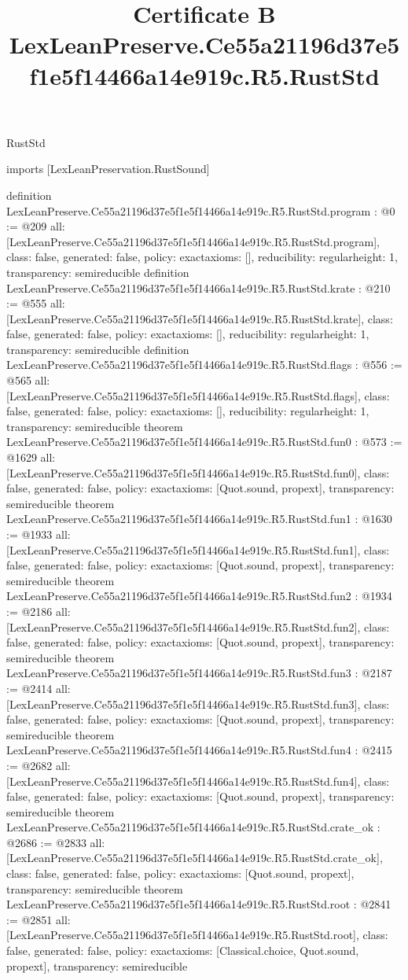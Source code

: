 \begin{lexlean}{RustStd}
\title{Certificate B LexLeanPreserve.Ce55a21196d37e5f1e5f14466a14e919c.R5.RustStd}
\begin{coremodule}
imports [LexLeanPreservation.RustSound]

definition LexLeanPreserve.Ce55a21196d37e5f1e5f14466a14e919c.R5.RustStd.program : @0 := @209 {
  all: [LexLeanPreserve.Ce55a21196d37e5f1e5f14466a14e919c.R5.RustStd.program],
  class: false,
  generated: false,
  policy: exact{axioms: []},
  reducibility: regular{height: 1},
  transparency: semireducible
}
definition LexLeanPreserve.Ce55a21196d37e5f1e5f14466a14e919c.R5.RustStd.krate : @210 := @555 {
  all: [LexLeanPreserve.Ce55a21196d37e5f1e5f14466a14e919c.R5.RustStd.krate],
  class: false,
  generated: false,
  policy: exact{axioms: []},
  reducibility: regular{height: 1},
  transparency: semireducible
}
definition LexLeanPreserve.Ce55a21196d37e5f1e5f14466a14e919c.R5.RustStd.flags : @556 := @565 {
  all: [LexLeanPreserve.Ce55a21196d37e5f1e5f14466a14e919c.R5.RustStd.flags],
  class: false,
  generated: false,
  policy: exact{axioms: []},
  reducibility: regular{height: 1},
  transparency: semireducible
}
theorem LexLeanPreserve.Ce55a21196d37e5f1e5f14466a14e919c.R5.RustStd.fun0 : @573 := @1629 {
  all: [LexLeanPreserve.Ce55a21196d37e5f1e5f14466a14e919c.R5.RustStd.fun0],
  class: false,
  generated: false,
  policy: exact{axioms: [Quot.sound, propext]},
  transparency: semireducible
}
theorem LexLeanPreserve.Ce55a21196d37e5f1e5f14466a14e919c.R5.RustStd.fun1 : @1630 := @1933 {
  all: [LexLeanPreserve.Ce55a21196d37e5f1e5f14466a14e919c.R5.RustStd.fun1],
  class: false,
  generated: false,
  policy: exact{axioms: [Quot.sound, propext]},
  transparency: semireducible
}
theorem LexLeanPreserve.Ce55a21196d37e5f1e5f14466a14e919c.R5.RustStd.fun2 : @1934 := @2186 {
  all: [LexLeanPreserve.Ce55a21196d37e5f1e5f14466a14e919c.R5.RustStd.fun2],
  class: false,
  generated: false,
  policy: exact{axioms: [Quot.sound, propext]},
  transparency: semireducible
}
theorem LexLeanPreserve.Ce55a21196d37e5f1e5f14466a14e919c.R5.RustStd.fun3 : @2187 := @2414 {
  all: [LexLeanPreserve.Ce55a21196d37e5f1e5f14466a14e919c.R5.RustStd.fun3],
  class: false,
  generated: false,
  policy: exact{axioms: [Quot.sound, propext]},
  transparency: semireducible
}
theorem LexLeanPreserve.Ce55a21196d37e5f1e5f14466a14e919c.R5.RustStd.fun4 : @2415 := @2682 {
  all: [LexLeanPreserve.Ce55a21196d37e5f1e5f14466a14e919c.R5.RustStd.fun4],
  class: false,
  generated: false,
  policy: exact{axioms: [Quot.sound, propext]},
  transparency: semireducible
}
theorem LexLeanPreserve.Ce55a21196d37e5f1e5f14466a14e919c.R5.RustStd.crate_ok : @2686 := @2833 {
  all: [LexLeanPreserve.Ce55a21196d37e5f1e5f14466a14e919c.R5.RustStd.crate_ok],
  class: false,
  generated: false,
  policy: exact{axioms: [Quot.sound, propext]},
  transparency: semireducible
}
theorem LexLeanPreserve.Ce55a21196d37e5f1e5f14466a14e919c.R5.RustStd.root : @2841 := @2851 {
  all: [LexLeanPreserve.Ce55a21196d37e5f1e5f14466a14e919c.R5.RustStd.root],
  class: false,
  generated: false,
  policy: exact{axioms: [Classical.choice, Quot.sound, propext]},
  transparency: semireducible
}


\end{coremodule}
\end{lexlean}
